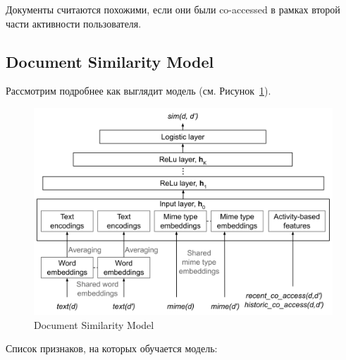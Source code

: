 Документы считаются похожими, если они были co-accessed в рамках второй части активности пользователя.

\subsection*{Document Similarity Model}

Рассмотрим подробнее как выглядит модель (см. Рисунок~\ref{fig:dsm}).

\begin{figure}[ht]
    \centering
    \includegraphics[width=0.7\linewidth]{images/dsm.png}
    \caption{\footnotesize{Document Similarity Model}}
    \label{fig:dsm}
\end{figure}

Список признаков, на которых обучается модель:

